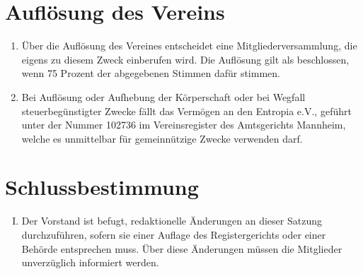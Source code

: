 \documentclass[12pt,a4paper,titlepage]{scrartcl}
\begin{document}
\section{Auflösung des Vereins}
\begin{enumerate}
\item Über die Auflösung des Vereines entscheidet eine Mitgliederversammlung, die eigens zu diesem Zweck einberufen wird. Die Auflösung gilt als beschlossen, wenn 75 Prozent der abgegebenen Stimmen dafür stimmen.
\item  Bei Auflösung oder Aufhebung der Körperschaft oder bei Wegfall steuerbegünstigter Zwecke fällt das Vermögen an den Entropia e.V., geführt unter der Nummer 102736 im Vereinsregister des Amtsgerichts Mannheim, welche es unmittelbar für gemeinnützige Zwecke verwenden darf.
\end{enumerate}


\section{Schlussbestimmung}
\begin{enumerate}[I.]
\item Der Vorstand ist befugt, redaktionelle Änderungen an dieser Satzung durchzuführen,
sofern sie einer Auflage des Registergerichts oder einer Behörde entsprechen muss. Über diese Änderungen müssen die Mitglieder unverzüglich informiert werden.
\end{enumerate}
\end{document}
